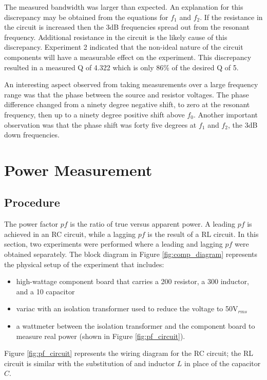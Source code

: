 \documentclass[12pt]{article}
\newcommand{\rms}{\ensuremath{_{rms}}}
\providecommand{\units}[1]{\;\text{#1}}
\begin{document}
The measured bandwidth was larger than expected. An explanation for this discrepancy may be obtained from the equations for $f_1$ and $f_2$. If the resistance in the circuit is increased then the 3dB frequencies spread out from the resonant frequency. Additional resistance in the circuit is the likely cause of this discrepancy. Experiment 2 indicated that the non-ideal nature of the circuit components will have a measurable effect on the experiment.
This discrepancy resulted in a measured Q of 4.322 which is only 86\% of the desired Q of 5. 

An interesting aspect observed from taking measurements over a large frequency range was that the phase between the source and resistor voltages. The phase difference changed from a ninety degree negative shift, to zero at the resonant frequency, then up to a ninety degree positive shift above $f_{0}$. Another important observation was that the phase shift was forty five degrees at $f_{1}$ and $f_{2}$, the 3dB down frequencies.\\

\section{Power Measurement}\label{sec:power}
\subsection{Procedure}\label{sec:pow_procedure}
The power factor $pf$ is the ratio of true versus apparent power. A leading $pf$ is achieved in an RC circuit, while a lagging $pf$ is the result of a RL circuit. In this section, two experiments were performed where a leading and lagging $pf$ were obtained separately. The block diagram in Figure \ref{fig:comp_diagram} represents the physical setup of the experiment that includes: 
\begin{itemize}
	\item high-wattage component board that carries a 200\units{$\Omega$} resistor, a 300\units{mH} inductor, and a 10\units{$\mu$F} capacitor
	\item variac with an isolation transformer used to reduce the voltage to 50V\rms
	\item a wattmeter between the isolation transformer and the component board to measure real power (shown in Figure \ref{fig:pf_circuit}). 
\end{itemize}
Figure \ref {fig:pf_circuit} represents the wiring diagram for the RC circuit; the RL circuit is similar with the substitution of and inductor $L$ in place of the capacitor $C$.
\end{document}
